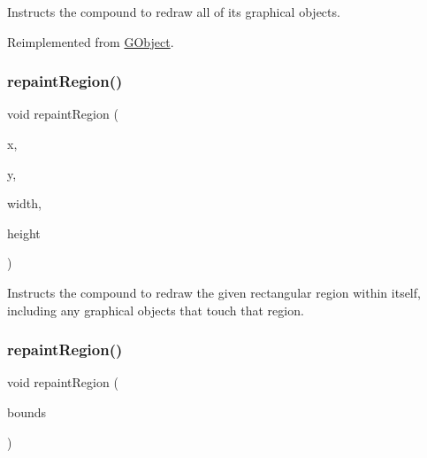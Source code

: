 Instructs the compound to redraw all of its graphical objects. 



Reimplemented from \mbox{\hyperlink{classGObject_ac827b978aa122f136a14c198687ad80f}{G\+Object}}.

\mbox{\label{classGCompound_a4a919e3851ebfbf0f161a66cc15d4531}} 
\subsubsection{\texorpdfstring{repaint\+Region()}{repaintRegion()}\hspace{0.1cm}{\footnotesize\ttfamily [1/2]}}
{\footnotesize\ttfamily void repaint\+Region (\begin{DoxyParamCaption}\item[{int}]{x,  }\item[{int}]{y,  }\item[{int}]{width,  }\item[{int}]{height }\end{DoxyParamCaption})\hspace{0.3cm}{\ttfamily [virtual]}}



Instructs the compound to redraw the given rectangular region within itself, including any graphical objects that touch that region. 

\mbox{\label{classGCompound_a769c46fb3e1004aec76e8b0adfa42aa6}} 
\subsubsection{\texorpdfstring{repaint\+Region()}{repaintRegion()}\hspace{0.1cm}{\footnotesize\ttfamily [2/2]}}
{\footnotesize\ttfamily void repaint\+Region (\begin{DoxyParamCaption}\item[{const \mbox{\hyperlink{classGRectangle}{G\+Rectangle}} \&}]{bounds }\end{DoxyParamCaption})\hspace{0.3cm}{\ttfamily [virtual]}}



